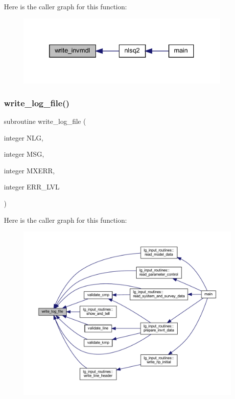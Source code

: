 Here is the caller graph for this function\+:\nopagebreak
\begin{figure}[H]
\begin{center}
\leavevmode
\includegraphics[width=301pt]{Leroi_8f90_a6e7ea94365af1aa0e4cf97b842e24cf6_icgraph}
\end{center}
\end{figure}
\mbox{\label{Leroi_8f90_a78d7005f266cbaf5c3ec23db494d00ba}} 
\subsubsection{\texorpdfstring{write\+\_\+log\+\_\+file()}{write\_log\_file()}}
{\footnotesize\ttfamily subroutine write\+\_\+log\+\_\+file (\begin{DoxyParamCaption}\item[{integer}]{N\+LG,  }\item[{integer}]{M\+SG,  }\item[{integer}]{M\+X\+E\+RR,  }\item[{integer}]{E\+R\+R\+\_\+\+L\+VL }\end{DoxyParamCaption})}

Here is the caller graph for this function\+:\nopagebreak
\begin{figure}[H]
\begin{center}
\leavevmode
\includegraphics[width=350pt]{Leroi_8f90_a78d7005f266cbaf5c3ec23db494d00ba_icgraph}
\end{center}
\end{figure}
\mbox{\label{Leroi_8f90_a050575d7cd77b6819922e9b6aa765af7}} 

